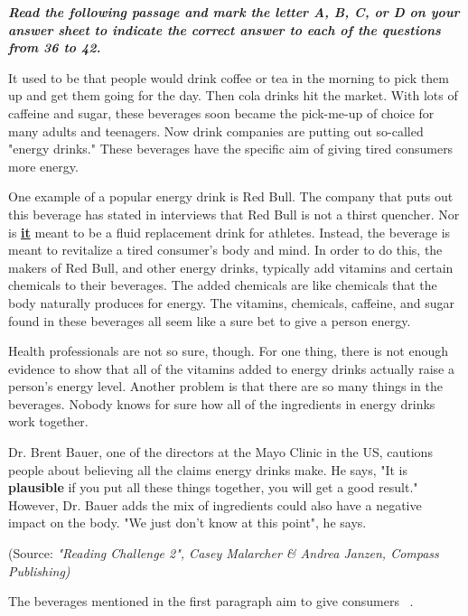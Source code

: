 \documentclass[11pt]{article}
\def\ktrang{\makebox[1.5cm]{\hrulefill}\ }
\begin{document}
\begin{multiplechoice}[rearrange=yes, keycolumns=2]%
\examvspace*{0.7cm}
\textit{\textbf{Read the following passage and mark the letter A, B, C, or D on your answer sheet to indicate the
correct answer to each of the questions from 36 to 42.}}

It used to be that people would drink coffee or tea in the morning to pick them up and get them going for
the day. Then cola drinks hit the market. With lots of caffeine and sugar, these beverages soon became the
pick-me-up of choice for many adults and teenagers. Now drink companies are putting out so-called "energy
drinks." These beverages have the specific aim of giving tired consumers more energy.

One example of a popular energy drink is Red Bull. The company that puts out this beverage has stated in
interviews that Red Bull is not a thirst quencher. Nor is \underline{\textbf{it}} meant to be a fluid replacement drink for athletes.
Instead, the beverage is meant to revitalize a tired consumer's body and mind. In order to do this, the makers
of Red Bull, and other energy drinks, typically add vitamins and certain chemicals to their beverages. The added
chemicals are like chemicals that the body naturally produces for energy. The vitamins, chemicals, caffeine, and
sugar found in these beverages all seem like a sure bet to give a person energy.

Health professionals are not so sure, though. For one thing, there is not enough evidence to show that all of
the vitamins added to energy drinks actually raise a person's energy level. Another problem is that there are so
many things in the beverages. Nobody knows for sure how all of the ingredients in energy drinks work together.

Dr. Brent Bauer, one of the directors at the Mayo Clinic in the US, cautions people about believing all the
claims energy drinks make. He says, "It is \textbf{plausible} if you put all these things together, you will get a good
result." However, Dr. Bauer adds the mix of ingredients could also have a negative impact on the body. "We
just don't know at this point", he says.

(Source: \textit{"Reading Challenge 2", Casey Malarcher \& Andrea Janzen, Compass Publishing)}

\begin{question} %
The beverages mentioned in the first paragraph aim to give consumers \ktrang .
\datcot
\bonpa
{}
{}
{}
{}
\end{question}


\end{multiplechoice}
\end{document}
